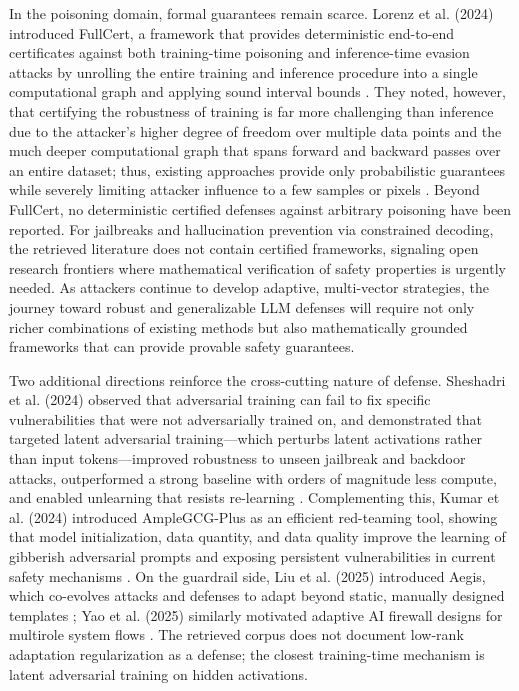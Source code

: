 \documentclass[11pt,a4paper]{article}
\begin{document}
In the poisoning domain, formal guarantees remain scarce. Lorenz et al. (2024) introduced FullCert, a framework that provides deterministic end-to-end certificates against both training-time poisoning and inference-time evasion attacks by unrolling the entire training and inference procedure into a single computational graph and applying sound interval bounds \cite{Lorenz_2024_Fullcert_7dbc4820}. They noted, however, that certifying the robustness of training is far more challenging than inference due to the attacker's higher degree of freedom over multiple data points and the much deeper computational graph that spans forward and backward passes over an entire dataset; thus, existing approaches provide only probabilistic guarantees while severely limiting attacker influence to a few samples or pixels \cite{Lorenz_2024_Fullcert_7dbc4820}. Beyond FullCert, no deterministic certified defenses against arbitrary poisoning have been reported. For jailbreaks and hallucination prevention via constrained decoding, the retrieved literature does not contain certified frameworks, signaling open research frontiers where mathematical verification of safety properties is urgently needed. As attackers continue to develop adaptive, multi-vector strategies, the journey toward robust and generalizable LLM defenses will require not only richer combinations of existing methods but also mathematically grounded frameworks that can provide provable safety guarantees.

Two additional directions reinforce the cross-cutting nature of defense. Sheshadri et al. (2024) observed that adversarial training can fail to fix specific vulnerabilities that were not adversarially trained on, and demonstrated that targeted latent adversarial training---which perturbs latent activations rather than input tokens---improved robustness to unseen jailbreak and backdoor attacks, outperformed a strong baseline with orders of magnitude less compute, and enabled unlearning that resists re-learning \cite{Sheshadri_2024_LLMs_ecd68cc1}. Complementing this, Kumar et al. (2024) introduced AmpleGCG-Plus as an efficient red-teaming tool, showing that model initialization, data quantity, and data quality improve the learning of gibberish adversarial prompts and exposing persistent vulnerabilities in current safety mechanisms \cite{Kumar_2024_LLMs_67538c80}. On the guardrail side, Liu et al. (2025) introduced Aegis, which co-evolves attacks and defenses to adapt beyond static, manually designed templates \cite{Liu_2025_Aegis_6081be1b}; Yao et al. (2025) similarly motivated adaptive AI firewall designs for multirole system flows \cite{Yao_2025_LLM_a1c8adc0}. The retrieved corpus does not document low-rank adaptation regularization as a defense; the closest training-time mechanism is latent adversarial training on hidden activations.
\end{document}
